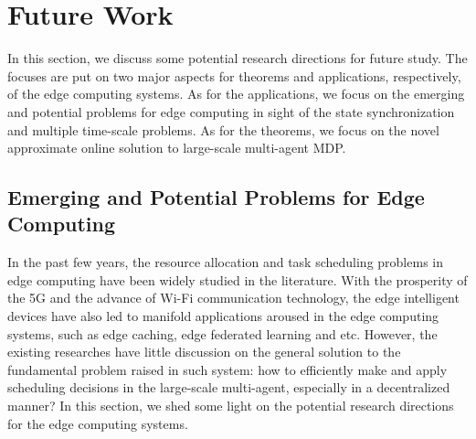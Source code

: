 %

\section{Future Work}
In this section, we discuss some potential research directions for future study.
The focuses are put on two major aspects for theorems and applications, respectively, of the edge computing systems.
As for the applications, we focus on the emerging and potential problems for edge computing in sight of the state synchronization and multiple time-scale problems.
As for the theorems, we focus on the novel approximate online solution to large-scale multi-agent MDP.

\subsection{Emerging and Potential Problems for Edge Computing}
In the past few years, the resource allocation and task scheduling problems in edge computing have been widely studied in the literature.
With the prosperity of the 5G and the advance of Wi-Fi communication technology, the edge intelligent devices have also led to manifold applications aroused in the edge computing systems, such as edge caching, edge federated learning and etc.
However, the existing researches have little discussion on the general solution to the fundamental problem raised in such system: how to efficiently make and apply scheduling decisions in the large-scale multi-agent, especially in a decentralized manner?
In this section, we shed some light on the potential research directions for the edge computing systems.

